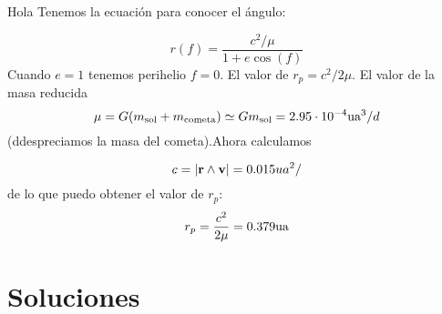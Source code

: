 \begin{texercise}
    Hola
    \tcblower
    Tenemos la ecuación para conocer el ángulo:

    \begin{equation}
        r(f) = \frac{c^2/ \mu}{1+e\cos(f)}
    \end{equation}
    Cuando $e=1$ tenemos perihelio $f=0$. El valor de $r_p = c^2/2\mu$. El valor de la masa reducida $$\mu=G(m_{\text{sol}}+m_{\text{cometa}})\simeq G m_{\text{sol}} = 2.95\cdot 10^{-4} \text{ua}^3/d$$(ddespreciamos la masa del cometa).Ahora calculamos 

    \begin{equation}
        c=|\rn\wedge\vn|=0.015 \*ua^2/
    \end{equation}
    de lo que puedo obtener el valor de $r_p$:
    \begin{equation}
        r_p = \frac{c^2}{2\mu} = 0.379 \text{ua}
    \end{equation}
\end{texercise}
\tcbstoprecording

\section{{Soluciones}}

\tcbinputrecords
